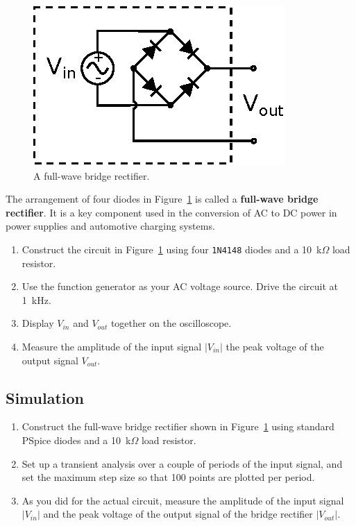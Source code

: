 \documentclass[11pt]{article}
\begin{document}
\begin{figure}[h]
\centering
\includegraphics{bridgerectifier.eps}
\caption{A full-wave bridge rectifier.}
\label{fig:bridgerectifier}
\end{figure}
The arrangement of four diodes in Figure~\ref{fig:bridgerectifier} is
called a \textbf{full-wave bridge rectifier}. It is a key component
used in the conversion of AC to DC power in power supplies and
automotive charging systems. 

\begin{enumerate}
\item Construct the circuit in
  Figure~\ref{fig:bridgerectifier} using four \texttt{1N4148} diodes
  and a 10~k$\Omega$ load resistor.

\item Use the function generator as your AC voltage source. Drive the
  circuit at 1~kHz. 
  
\item Display $V_{in}$ and $V_{out}$ together on the oscilloscope.

\item Measure the amplitude of the input signal $|V_{in}|$ the peak
  voltage of the output signal $V_{out}$.
\end{enumerate}

\subsection*{Simulation}

\begin{enumerate}
\item Construct the full-wave bridge rectifier shown in
  Figure~\ref{fig:bridgerectifier} using standard PSpice diodes
  and a 10~k$\Omega$ load resistor.

\item Set up a transient analysis over a couple of periods of the
  input signal, and set the maximum step size so that 100
  points are plotted per period.

\item As you did for the actual circuit, measure the amplitude of the
  input signal $|V_{in}|$ and the peak voltage of the output signal of
  the bridge rectifier $|V_{out}|$.
  
\end{enumerate}
\end{document}
